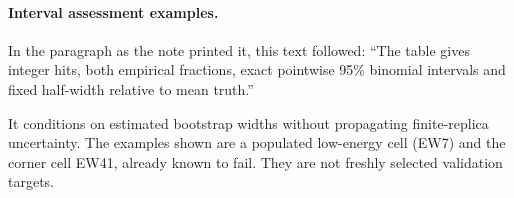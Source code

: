 \paragraph{Interval assessment examples.} In the paragraph as the note printed it, this text followed: ``The table gives integer hits, both empirical fractions, exact pointwise 95\% binomial intervals and fixed half-width relative to mean truth.''\par It conditions on estimated bootstrap widths without propagating finite-replica uncertainty. The examples shown are a populated low-energy cell (EW7) and the corner cell EW41, already known to fail. They are not freshly selected validation targets.

